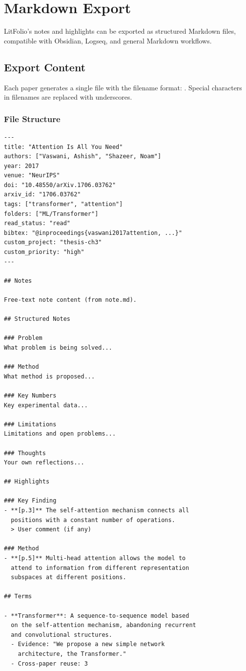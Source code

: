 \chapter{Markdown Export}
\label{ch:markdown-export}

LitFolio's notes and highlights can be exported as structured Markdown files, compatible
with Obsidian, Logseq, and general Markdown workflows.

\section{Export Content}

Each paper generates a single  file with the filename format:
. Special characters in
filenames are replaced with underscores.

\subsection{File Structure}

\begin{verbatim}
---
title: "Attention Is All You Need"
authors: ["Vaswani, Ashish", "Shazeer, Noam"]
year: 2017
venue: "NeurIPS"
doi: "10.48550/arXiv.1706.03762"
arxiv_id: "1706.03762"
tags: ["transformer", "attention"]
folders: ["ML/Transformer"]
read_status: "read"
bibtex: "@inproceedings{vaswani2017attention, ...}"
custom_project: "thesis-ch3"
custom_priority: "high"
---

## Notes

Free-text note content (from note.md).

## Structured Notes

### Problem
What problem is being solved...

### Method
What method is proposed...

### Key Numbers
Key experimental data...

### Limitations
Limitations and open problems...

### Thoughts
Your own reflections...

## Highlights

### Key Finding
- **[p.3]** The self-attention mechanism connects all
  positions with a constant number of operations.
  > User comment (if any)

### Method
- **[p.5]** Multi-head attention allows the model to
  attend to information from different representation
  subspaces at different positions.

## Terms

- **Transformer**: A sequence-to-sequence model based
  on the self-attention mechanism, abandoning recurrent
  and convolutional structures.
  - Evidence: "We propose a new simple network
    architecture, the Transformer."
  - Cross-paper reuse: 3
\end{verbatim}

